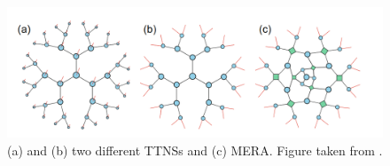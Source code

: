 \begin{figure}[!htbp]
  \center
  \includegraphics[width=0.8 \textwidth]{Figuren/tnalgs/tnns_and_mera.png}
  \caption{ (a) and (b) two different TTNSs and (c) MERA. Figure taken from \cite{Ran2020}.  }
  \label{fig:tnalgs:ttn_mera}
\end{figure}


